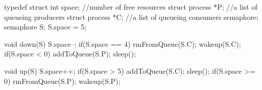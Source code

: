 \documentclass[varwidth=26em,crop]{standalone}
\begin{document}
    \begin{ccode}
typedef struct{
  int space;         //number of free resources
  struct process *P; //a list of queueing producers
  struct process *C; //a list of queueing consumers
} semaphore;
semaphore S;
S.space = 5;        
\end{ccode}
\vspace{.5em}
  \begin{minipage}{.4\linewidth}
    \begin{ccode}
void down(S){
  S.space--;
  if(S.space == 4){
    rmFromQueue(S.C);
    wakeup(S.C);
  }
  if(S.space < 0){
    addToQueue(S.P);
    sleep();
  }
}
    \end{ccode}
  \end{minipage}\qquad
  \begin{minipage}{.4\linewidth}
    \begin{ccode}
void up(S){
  S.space++;
  if(S.space > 5){
    addToQueue(S.C);
    sleep();
  }
  if(S.space >= 0){
    rmFromQueue(S.P);
    wakeup(S.P);
  }
}
    \end{ccode}
  \end{minipage}
\end{document}
